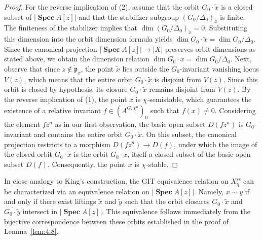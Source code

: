 \documentclass[11pt,a4paper,reqno,noamsfonts]{amsart}
\numberwithin{equation}{section}
\theoremstyle{definition}
\theoremstyle{remark}
\newcommand{\uss}{\ensuremath{\mathrm{ss}}}
\newcommand{\pfrak}{\ensuremath{\mathfrak{p}}}
\DeclareMathOperator{\sSpec}{\mathbf{Spec}}
\begin{document}
\begin{proof}
For the reverse implication of (2), assume that the orbit $G_0 \cdot \tilde{x}$ is a closed subset of $\lvert \sSpec A[z]\rvert$ and that the stabilizer subgroup $(G_0/\Delta_0)_{\tilde{x}}$ is finite. The finiteness of the stabilizer implies that $\dim (G_0/\Delta_0)_{\tilde{x}} = 0$. Substituting this dimension into the orbit dimension formula yields $\dim G_0 \cdot \tilde{x} = \dim G_0/\Delta_0$. Since the canonical projection $\lvert \sSpec A[z]\rvert \to \lvert X\rvert$ preserves orbit dimensions as stated above, we obtain the dimension relation $\dim G_0 \cdot x = \dim G_0/\Delta_0$. Next, observe that since $z \notin \tilde{\pfrak}_{\tilde{x}}$, the point $\tilde{x}$ lies outside the $G_0$-invariant vanishing locus $V(z)$, which means that the entire orbit $G_0 \cdot \tilde{x}$ is disjoint from $V(z)$. Since this orbit is closed by hypothesis, its closure $\overline{G_0 \cdot \tilde{x}}$ remains disjoint from $V(z)$. By the reverse implication of (1), the point $x$ is $\chi$-semistable, which guarantees the existence of a relative invariant $f \in (A^{G,\chi^n})_0$ such that $f(x) \neq 0$. Considering the element $f z^n$ as in our first observation, the basic open subset $D(f z^n)$ is $G_0$-invariant and contains the entire orbit $G_0 \cdot \tilde{x}$. On this subset, the canonical projection restricts to a morphism $D(f z^n) \to D(f)$, under which the image of the closed orbit $G_0 \cdot \tilde{x}$ is the orbit $G_0 \cdot x$, itself a closed subset of the basic open subset $D(f)$. Consequently, the point $x$ is $\chi$-stable.
\end{proof}

In close analogy to King's construction, the GIT equivalence relation on $X_{\chi}^{\uss}$ can be characterized via an equivalence relation on $\lvert \sSpec A[z] \rvert$. Namely, $x \sim y$ if and only if there exist liftings $\tilde{x}$ and $\tilde{y}$ such that the orbit closures $\overline{G_0 \cdot \tilde{x}}$ and $\overline{G_0 \cdot \tilde{y}}$ intersect in $\lvert \sSpec A[z] \rvert$. This equivalence follows immediately from the bijective correspondence between these orbits established in the proof of Lemma~\ref{lem:4.8}.
\end{document}
